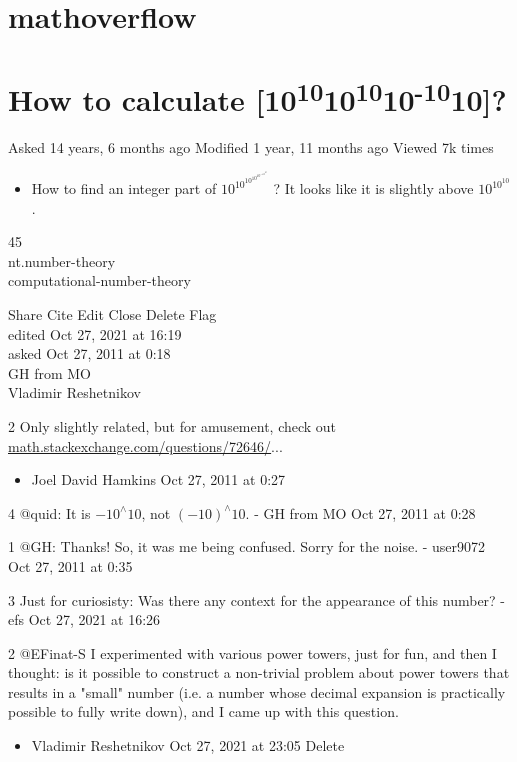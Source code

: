\documentclass[10pt]{article}
\begin{document}
\section*{mathoverflow}
\section*{How to calculate [10\textsuperscript{10}10\textsuperscript{10}10\textsuperscript{-10}10]?}
Asked 14 years, 6 months ago Modified 1 year, 11 months ago Viewed 7k times

\begin{itemize}
  \item How to find an integer part of $10^{10^{10^{10^{10^{-10^{10}}}}}}$ ? It looks like it is slightly above $10^{10^{10}}$.
\end{itemize}

45\\
nt.number-theory\\
computational-number-theory

Share Cite Edit Close Delete Flag\\
edited Oct 27, 2021 at 16:19\\
asked Oct 27, 2011 at 0:18\\
GH from MO\\
Vladimir Reshetnikov

2 Only slightly related, but for amusement, check out \href{http://math.stackexchange.com/questions/72646/}{math.stackexchange.com/questions/72646/}...

\begin{itemize}
  \item Joel David Hamkins Oct 27, 2011 at 0:27
\end{itemize}

4 @quid: It is $-10^{\wedge} 10$, not $(-10)^{\wedge} 10$. - GH from MO Oct 27, 2011 at 0:28

1 @GH: Thanks! So, it was me being confused. Sorry for the noise. - user9072 Oct 27, 2011 at 0:35

3 Just for curiosisty: Was there any context for the appearance of this number? - efs Oct 27, 2021 at 16:26

2 @EFinat-S I experimented with various power towers, just for fun, and then I thought: is it possible to construct a non-trivial problem about power towers that results in a "small" number (i.e. a number whose decimal expansion is practically possible to fully write down), and I came up with this question.

\begin{itemize}
  \item Vladimir Reshetnikov Oct 27, 2021 at 23:05 Delete
\end{itemize}
\end{document}

